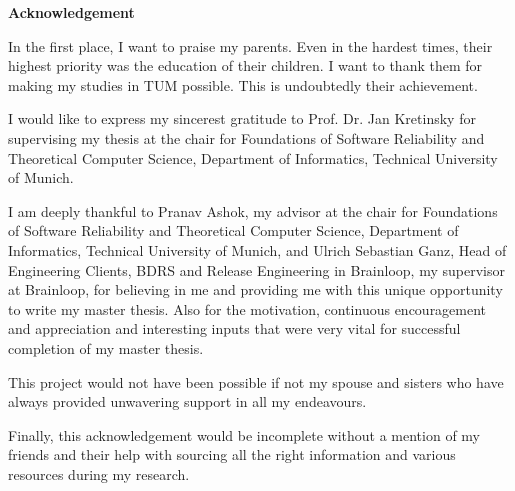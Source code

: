 
\newpage
{}
\thispagestyle{empty}
\hoffset=0mm
\begin{center}
    {\Large \bf Acknowledgement}
\end{center}

\vspace{1cm}

In the first place, I want to praise my parents. Even in the hardest times, their highest priority was the education of their children. I want to thank them for making my studies in TUM possible. This is undoubtedly their achievement.

I would like to express my sincerest gratitude to Prof. Dr. Jan Kretinsky for supervising my thesis at the chair for Foundations of Software Reliability and Theoretical Computer Science, Department of Informatics, Technical University of Munich. 

I am deeply thankful to Pranav Ashok, my advisor at the chair for Foundations of Software Reliability and Theoretical Computer Science, Department of Informatics, Technical University of Munich, and Ulrich Sebastian Ganz, Head of Engineering Clients, BDRS and Release Engineering in Brainloop, my supervisor at Brainloop, for believing in me and providing me with this unique opportunity to write my master thesis. Also for the motivation, continuous encouragement and appreciation and interesting inputs that were very vital for successful completion of my master thesis.

This project would not have been possible if not my spouse and sisters who have always provided unwavering support in all my endeavours.

Finally, this acknowledgement would be incomplete without a mention of my friends and their help with sourcing all the right information and various resources during my research.

